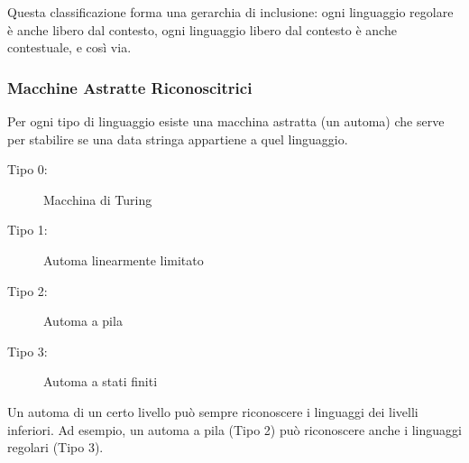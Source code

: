 Questa classificazione forma una gerarchia di inclusione: ogni linguaggio regolare è anche libero dal contesto, ogni linguaggio libero dal contesto è anche contestuale, e così via.

\subsubsection{Macchine Astratte Riconoscitrici}
Per ogni tipo di linguaggio esiste una macchina astratta (un automa) che serve per stabilire se una data stringa appartiene a quel linguaggio.
\begin{description}
    \item[Tipo 0:] Macchina di Turing
    \item[Tipo 1:] Automa linearmente limitato 
    \item[Tipo 2:] Automa a pila 
    \item[Tipo 3:] Automa a stati finiti 
\end{description}
Un automa di un certo livello può sempre riconoscere i linguaggi dei livelli inferiori. Ad esempio, un automa a pila (Tipo 2) può riconoscere anche i linguaggi regolari (Tipo 3).

